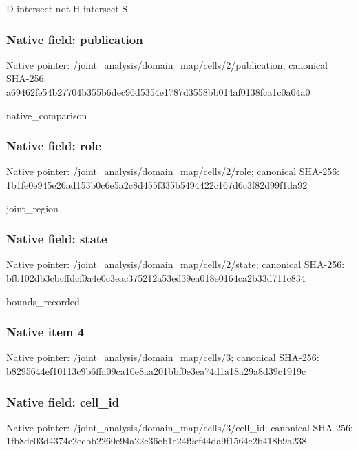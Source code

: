 \documentclass[10pt,a4paper]{article}
\begin{document}
D intersect not H intersect S


\subsubsection{Native field: publication}


Native pointer: /joint\_analysis/domain\_m\allowbreak{}ap/cells/2/publication; canonical SHA-256: a69462fe54b27704b355b6de\allowbreak{}c96d5354e1787d3558bb014a\allowbreak{}f0138fca1c0a04a0


native\_comparison


\subsubsection{Native field: role}


Native pointer: /joint\_analysis/domain\_map/cells/2/role; canonical SHA-256: 1b1fe0e945e26ad153b0c6e5\allowbreak{}a2c8d455f335b5494422c167\allowbreak{}d6c3f82d99f1da92


joint\_region


\subsubsection{Native field: state}


Native pointer: /joint\_analysis/domain\_m\allowbreak{}ap/cells/2/state; canonical SHA-256: bfb102db3cbcffdcf0a4e0c3\allowbreak{}eac375212a53ed39ea018e01\allowbreak{}64ca2b33d711c834


bounds\_recorded


\subsubsection{Native item 4}


Native pointer: /joint\_analysis/domain\_map/cells/3; canonical SHA-256: b8295644ef10113c9b6ffa09\allowbreak{}ca10e8aa201bbf0e3ea74d1a\allowbreak{}18a29a8d39c1919c



\subsubsection{Native field: cell\_id}


Native pointer: /joint\_analysis/domain\_m\allowbreak{}ap/cells/3/cell\_id; canonical SHA-256: 1fb8de03d4374c2ecbb2260e\allowbreak{}94a22c36eb1e24f9ef44da9f\allowbreak{}1564e2b418b9a238
\end{document}
